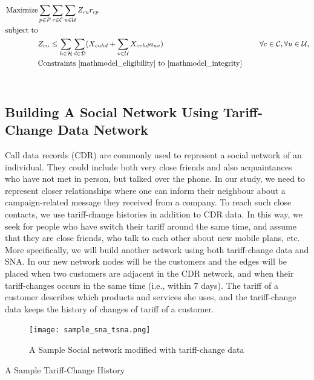 \documentclass[11pt]{article}
\begin{document}
\begin{align}
\text{Maximize} & \displaystyle
\sum\limits_{p\in \mathcal{P}}\sum\limits_{c\in \mathcal{C}}\sum\limits_{u\in \mathcal{U}}Z_{{c}{u}} r_{{c}{p}} \label{mathmodel_w/n_obj}&
\\
\text{subject to} \notag\\
&Z_{{c}{u}} \leq \sum\limits_{h\in \mathcal{H}}\sum\limits_{d\in \mathcal{D}}(X_{{c}{u}{h}{d}}+\sum\limits_{v\in\mathcal{U}}X_{{c}{v}{h}{d}}a_{{u}{v}}) &&&\forall c \in \mathcal{C}, \forall u \in \mathcal{U},\label{mathmodel_w/n_netcoverage}
\\
&\text{Constraints \eqref{mathmodel_eligibility} to \eqref{mathmodel_integrity} }\notag
\end{align}\\

\subsection{Building A Social Network Using Tariff-Change Data Network}\label{s:micro-world-networks}
Call data records (CDR) are commonly used to represent a social network of an individual. They could include both very close friends and also acquaintances who have not met in person, but talked over the phone. In our study, we need to represent closer relationships where one can inform their neighbour about a campaign-related message they received from a company. To reach such close contacts, we use tariff-change histories in addition to CDR data. In this way, we seek for people who have switch their tariff around the same time, and assume that they are close friends, who talk to each other about new mobile plans, etc. More specifically, we will build another network using both tariff-change data and SNA. In our new network nodes will be the customers and the edges will be placed when two customers are adjacent in the CDR network, and when their tariff-changes occurs in the same time (i.e., within 7 days). The tariff of a customer describes which products and services she uses, and the tariff-change data keeps the history of changes of tariff of a customer.

\begin{figure}[htp]
    \centering
    \texttt{[image: sample\_sna\_tsna.png]}
    \caption{A Sample Social network modified with tariff-change data}
    \label{fig:fig_sample_sna}
\end{figure}
\begin{table}[htb]
    \centering
    \caption[Short Caption for LoT]{A Sample Tariff-Change History}\label{table:tbl_sample_tariff_change_history}
\end{table}
\end{document}
